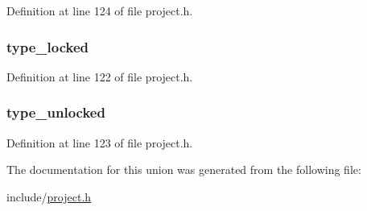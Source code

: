 \-Definition at line 124 of file project.\-h.

\hypertarget{unions__message__flags_ac13d4360deaf5e0a69a30a4b45ec42ed}{
\subsubsection[{type\-\_\-locked}]{ {\bf type\-\_\-locked}}}\label{unions__message__flags_ac13d4360deaf5e0a69a30a4b45ec42ed}


\-Definition at line 122 of file project.\-h.

\hypertarget{unions__message__flags_a4bfa5684da4ccc75b65c7f6929d6242a}{
\subsubsection[{type\-\_\-unlocked}]{ {\bf type\-\_\-unlocked}}}\label{unions__message__flags_a4bfa5684da4ccc75b65c7f6929d6242a}


\-Definition at line 123 of file project.\-h.



\-The documentation for this union was generated from the following file\-:\begin{DoxyCompactItemize}
\item 
include/\hyperlink{project_8h}{project.\-h}\end{DoxyCompactItemize}
